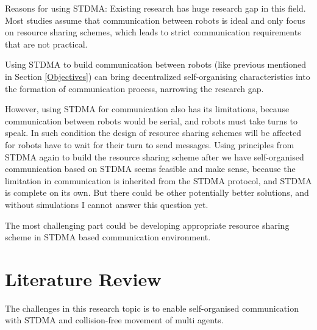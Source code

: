 \documentclass[12pt, oneside]{article}
\begin{document}
Reasons for using STDMA: Existing research has huge research gap in this field. Most studies assume that communication between robots is ideal \cite{Current_Research_Gap} and only focus on resource sharing schemes, which leads to strict communication requirements that are not practical.

Using STDMA to build communication between robots (like previous mentioned in Section \ref{Objectives}) can bring decentralized self-organising characteristics into the formation of communication process, narrowing the research gap. 

However, using STDMA for communication also has its limitations, because communication between robots would be serial, and robots must take turns to speak. In such condition the design of resource sharing schemes will be affected for robots have to wait for their turn to send messages. Using principles from STDMA again  to build the resource sharing scheme after we have self-organised communication based on STDMA seems feasible and make sense, because the limitation in communication is inherited from the STDMA protocol, and STDMA is complete on its own. But there could be other potentially better solutions, and without simulations I cannot answer this question yet. 

The most challenging part could be developing appropriate resource sharing scheme in STDMA based communication environment.


\pagebreak

\section{Literature Review}
\label{Literature_Review}



The challenges in this research topic is to enable self-organised communication with STDMA and collision-free movement of multi agents.
\end{document}
